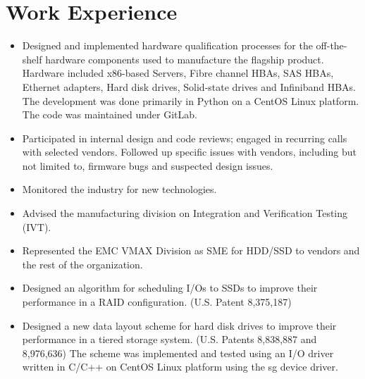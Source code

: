 \section{Work Experience}

{
	\begin{itemize}
		\item Designed and implemented hardware qualification processes for the
			off-the-shelf hardware components used to manufacture the flagship
			product. Hardware included x86-based Servers, Fibre channel HBAs,
			SAS HBAs, Ethernet adapters, Hard disk drives, Solid-state drives
			and Infiniband HBAs. The development was done primarily in Python
			on a CentOS Linux platform. The code was maintained under GitLab.
		\item Participated in internal design and code reviews; engaged in
			recurring calls with selected vendors. Followed up specific issues 
			with vendors, including but not limited to, firmware bugs and
			suspected design issues.
		\item  Monitored the industry for new technologies.
		\item Advised the manufacturing division on Integration and Verification Testing (IVT).
	\end{itemize}
}
{
	\begin{itemize}
		\item Represented the EMC VMAX Division as SME for HDD/SSD to vendors
			and the rest of the organization.
		\item Designed an algorithm for scheduling I/Os to SSDs to improve
			their performance in a RAID configuration. (U.S. Patent 8,375,187)
		\item Designed a new data layout scheme for hard disk drives to improve
			their performance in a tiered storage system. (U.S. Patents 8,838,887 and 8,976,636)
			The scheme was implemented and tested using an I/O driver written
			in C/C++ on CentOS Linux platform using the sg device driver.
	\end{itemize}
}
